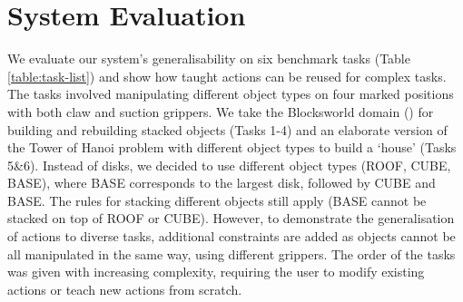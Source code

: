 \section{System Evaluation}
\label{sec:syseval}
We evaluate our system's generalisability on six benchmark tasks (Table \ref{table:task-list}) and show how taught actions can be reused for complex tasks.
The tasks involved manipulating different object types on four marked positions with both claw and suction grippers.
We take the Blocksworld domain (\cite{slaney2001blocks}) for building and rebuilding stacked objects (Tasks 1-4) and an elaborate version of the Tower of Hanoi problem with different object types to build a `house' (Tasks 5\&6).
Instead of disks, we decided to use different object types (ROOF, CUBE, BASE), where BASE corresponds to the largest disk, followed by CUBE and BASE.
The rules for stacking different objects still apply (\eg BASE cannot be stacked on top of ROOF or CUBE).
However, to demonstrate the generalisation of actions to diverse tasks, additional constraints are added as objects cannot be all manipulated in the same way, \ie using different grippers.
The order of the tasks was given with increasing complexity, requiring the user to modify existing actions or teach new actions from scratch.


